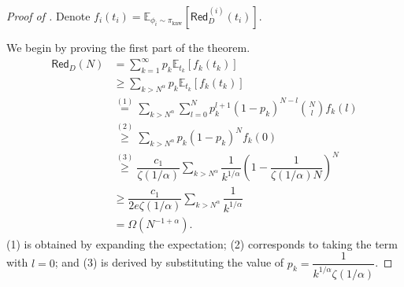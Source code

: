 \documentclass[10pt,a4paper]{amsart}
\newcommand{\basemeasure}{\pi_{\text{knw}}}
\newcommand{\dataerror}{\mathsf{Red}_D}
\newcommand{\testdataerror}{\mathsf{Red}_D}
\begin{document}
\begin{proof}[Proof of ]
Denote $f_i(t_i)=\mathbb{E}_{\phi_i\sim \basemeasure}[\dataerror^{(i)}(t_i)]$.

We begin by proving the first part of the theorem.
    \begin{align*}
        \testdataerror(N)&=\sum\limits_{k=1}^{\infty} p_k \mathbb{E}_{t_k}[f_k(t_k)]
        \\&\ge \sum\limits_{k> N^{\alpha}} p_k\mathbb{E}_{t_k}[f_k(t_k)] 
        \\& \overset{(1)}{=} \sum\limits_{k> N^{\alpha}}\sum\limits_{l=0}^N p_k^{l+1} (1-p_k)^{N-l}\binom{N}{l}f_k(l) \\
        &\overset{(2)}{\ge} \sum\limits_{k> N^{\alpha}} p_k (1-p_k)^{N} f_k(0)\\
        &\overset{(3)}{\ge} \dfrac{c_1}{\zeta(1/\alpha)}\sum\limits_{k> N^{\alpha}} \dfrac{1}{k^{1/\alpha}} \left(1-\dfrac{1}{\zeta(1/\alpha)N}\right)^{N} \\
        &\ge \dfrac{c_1}{2e\zeta(1/\alpha)}\sum\limits_{k> N^{\alpha}} \dfrac{1}{k^{1/\alpha}} \\
        &=  \Omega(N^{-1+\alpha}).
    \end{align*}
(1) is obtained by expanding the expectation; (2) corresponds to taking the term with $l = 0$; and (3) is derived by substituting the value of $p_k=\dfrac{1}{k^{1/\alpha}\zeta(1/\alpha)}$.



    


\end{proof}
\end{document}

